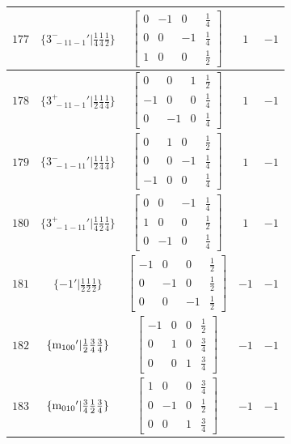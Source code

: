 \documentclass[fleqn,8pt]{jsarticle}
\begin{document}
\begin{longtable}{ccccc}
$ 177 $ & $ \{3^{-}_{\,\,-11-1}{}'|\frac{1}{4} \frac{1}{4} \frac{1}{2}\} $ & $ \begin{bmatrix} 0 & -1 & 0 & \frac{1}{4} \\ 0 & 0 & -1 & \frac{1}{4} \\ 1 & 0 & 0 & \frac{1}{2} \end{bmatrix} $ & $ 1 $ & $ -1 $ \\ \hline
$ 178 $ & $ \{3^{+}_{\,\,-11-1}{}'|\frac{1}{2} \frac{1}{4} \frac{1}{4}\} $ & $ \begin{bmatrix} 0 & 0 & 1 & \frac{1}{2} \\ -1 & 0 & 0 & \frac{1}{4} \\ 0 & -1 & 0 & \frac{1}{4} \end{bmatrix} $ & $ 1 $ & $ -1 $ \\ \hline
$ 179 $ & $ \{3^{-}_{\,\,-1-11}{}'|\frac{1}{2} \frac{1}{4} \frac{1}{4}\} $ & $ \begin{bmatrix} 0 & 1 & 0 & \frac{1}{2} \\ 0 & 0 & -1 & \frac{1}{4} \\ -1 & 0 & 0 & \frac{1}{4} \end{bmatrix} $ & $ 1 $ & $ -1 $ \\ \hline
$ 180 $ & $ \{3^{+}_{\,\,-1-11}{}'|\frac{1}{4} \frac{1}{2} \frac{1}{4}\} $ & $ \begin{bmatrix} 0 & 0 & -1 & \frac{1}{4} \\ 1 & 0 & 0 & \frac{1}{2} \\ 0 & -1 & 0 & \frac{1}{4} \end{bmatrix} $ & $ 1 $ & $ -1 $ \\ \hline
$ 181 $ & $ \{-1{}'|\frac{1}{2} \frac{1}{2} \frac{1}{2}\} $ & $ \begin{bmatrix} -1 & 0 & 0 & \frac{1}{2} \\ 0 & -1 & 0 & \frac{1}{2} \\ 0 & 0 & -1 & \frac{1}{2} \end{bmatrix} $ & $ -1 $ & $ -1 $ \\ \hline
$ 182 $ & $ \{{\rm m}_{100}{}'|\frac{1}{2} \frac{3}{4} \frac{3}{4}\} $ & $ \begin{bmatrix} -1 & 0 & 0 & \frac{1}{2} \\ 0 & 1 & 0 & \frac{3}{4} \\ 0 & 0 & 1 & \frac{3}{4} \end{bmatrix} $ & $ -1 $ & $ -1 $ \\ \hline
$ 183 $ & $ \{{\rm m}_{010}{}'|\frac{3}{4} \frac{1}{2} \frac{3}{4}\} $ & $ \begin{bmatrix} 1 & 0 & 0 & \frac{3}{4} \\ 0 & -1 & 0 & \frac{1}{2} \\ 0 & 0 & 1 & \frac{3}{4} \end{bmatrix} $ & $ -1 $ & $ -1 $ \\ \hline

\end{longtable}
\end{document}
